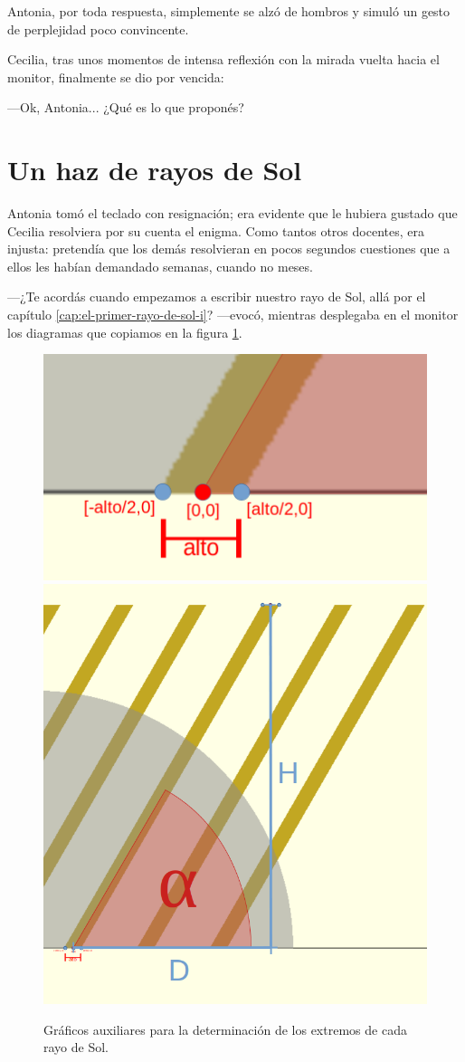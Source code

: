 Antonia, por toda respuesta, simplemente se alzó de hombros y simuló
un gesto de perplejidad poco convincente.

Cecilia, tras unos momentos de intensa reflexión con la mirada vuelta
hacia el monitor, finalmente se dio por vencida:

---Ok, Antonia... ¿Qué es lo que proponés?

\section{Un haz de rayos de Sol}

Antonia tomó el teclado con resignación; era evidente que le hubiera
gustado que Cecilia resolviera por su cuenta el enigma. Como tantos
otros docentes, era injusta: pretendía que los demás resolvieran en
pocos segundos cuestiones que a ellos les habían demandado semanas,
cuando no meses.

---¿Te acordás cuando empezamos a escribir nuestro rayo de Sol, allá
por el capítulo \ref{cap:el-primer-rayo-de-sol-i}? ---evocó, mientras
desplegaba en el monitor los diagramas que copiamos en la figura
\ref{fig:poligonos-auxiliares}.


\begin{figure}[t]
  \centering
  \includegraphics[width=.55\textwidth]{imagenes/poligono-puntos-base}\hfill
  \includegraphics[width=.44\textwidth]{imagenes/poligono-tangente}  
  \caption{Gráficos auxiliares para la determinación de los extremos
    de cada rayo de Sol.}
  \label{fig:poligonos-auxiliares}
\end{figure}


